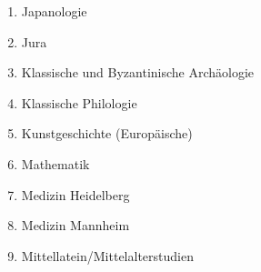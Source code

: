 \begin{enumerate}[noitemsep]
        \item Japanologie                                                                                                                                                                                                 \\
        \item Jura                                                                                                                                                                                                        \\
        \item Klassische und Byzantinische Archäologie                                                                                                                                                                    \\
        \item Klassische Philologie                                                                                                                                                                                       \\
        \item Kunstgeschichte (Europäische)                                                                                                                                                                               \\
        \item Mathematik                                                                                                                                                                                                  \\
        \item Medizin Heidelberg                                                                                                                                                                                          \\
        \item Medizin Mannheim                                                                                                                                                                                            \\
        \item Mittellatein/Mittelalterstudien                                                                                                                                                                             \\

\end{enumerate}
